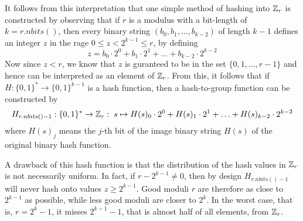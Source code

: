 It follows from this interpretation that one simple method of hashing into $\mathbb{Z}_r$ is constructed by observing that if $r$ is a modulus with a bit-length of $k=r.nbits()$, then every binary string $(b_0,b_1,\ldots,b_{k-2})$ of length $k-1$ defines an integer $z$ in the rage $0\leq z < 2^{k-1}\leq r $, by defining
\begin{equation}
z = b_0\cdot 2^0 + b_1\cdot 2^1 + \ldots + b_{k-2}\cdot 2^{k-2}
\end{equation}
Now since $z<r$, we know that $z$ is guranteed to be in the set $\{0,1,\ldots,r-1\}$ and hence can be interpreted as an element of $\mathbb{Z}_r$. From this, it follows that if $H:\{0,1\}^*\to\{0,1\}^{k-1}$ is a hash function, then a hash-to-group function can be constructed by
\begin{equation}
H_{r.nbits()-1}: \{0,1\}^* \to \mathbb{Z}_r: \; s \mapsto 
H(s)_0\cdot 2^0 + H(s)_1\cdot 2^1 + \ldots + H(s)_{k-2}\cdot 2^{k-2}
\end{equation}
where $H(s)_j$ means the $j$-th bit of the image binary string $H(s)$ of the original binary hash function. 

A drawback of this hash function is that the distribution of the hash values in $\mathbb{Z}_r$ is not necessarily uniform. In fact, if $r-2^{k-1}\neq 0$, then by design $H_{r.nbits()-1}$ will never hash onto values $z\geq 2^{k-1}$. Good moduli $r$ are therefore as close to $2^{k-1}$ as possible, while less good moduli are closer to $2^k$. In the worst case, that is, $r=2^k-1$, it misses $2^{k-1}-1$, that is almost half of all elements, from $\mathbb{Z}_r$.

